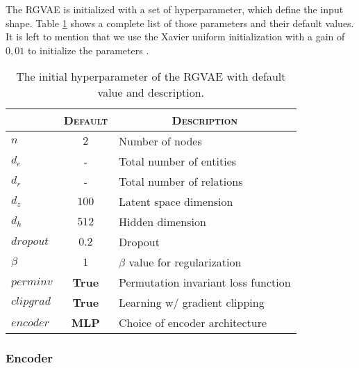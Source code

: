 The RGVAE is initialized with a set of hyperparameter, which define the input shape. Table \ref{tab:RGVAEhyp} shows a complete list of those parameters and their default values. It is left to mention that we use the Xavier uniform initialization with a gain of $0,01$ to initialize the parameters \cite{glorot2010understanding}.

\begin{table}[H]
\centering
    \begin{tabular}{|l|l|l|}
    \hline
    \rowcolor[HTML]{EFEFEF}
    \multicolumn{1}{|c}{\textsc{Hyerp.}} & \multicolumn{1}{c}{\textsc{Default}} & \multicolumn{1}{c|}{\textsc{Description}} \\\hline
    $n$     & \multicolumn{1}{c|}{$2$} & Number of nodes  \\
    $d_e$   &\multicolumn{1}{c|}{-}   & Total number of entities\\
    $d_r$   &\multicolumn{1}{c|}{-} & Total number of relations\\
    $d_z$ &\multicolumn{1}{c|}{$100$}   & Latent space dimension\\
    $d_h$ &\multicolumn{1}{c|}{$512$}   & Hidden dimension\\
    $dropout$ &\multicolumn{1}{c|}{$0.2$}   & Dropout\\
    $\beta$ & \multicolumn{1}{c|}{$1$}  & $\beta$ value for regularization  \\
    $perminv$ & \multicolumn{1}{c|}{\textbf{True}}  & Permutation invariant loss function  \\
    $clipgrad$ & \multicolumn{1}{c|}{\textbf{True}}  & Learning w/ gradient clipping  \\
    $encoder$ & \multicolumn{1}{c|}{\textbf{MLP}}  & Choice of encoder architecture  \\
    \hline
    \end{tabular}
    \caption{The initial hyperparameter of the RGVAE with default value and description.}
    \label{tab:RGVAEhyp}
\end{table}


\subsubsection{Encoder}

